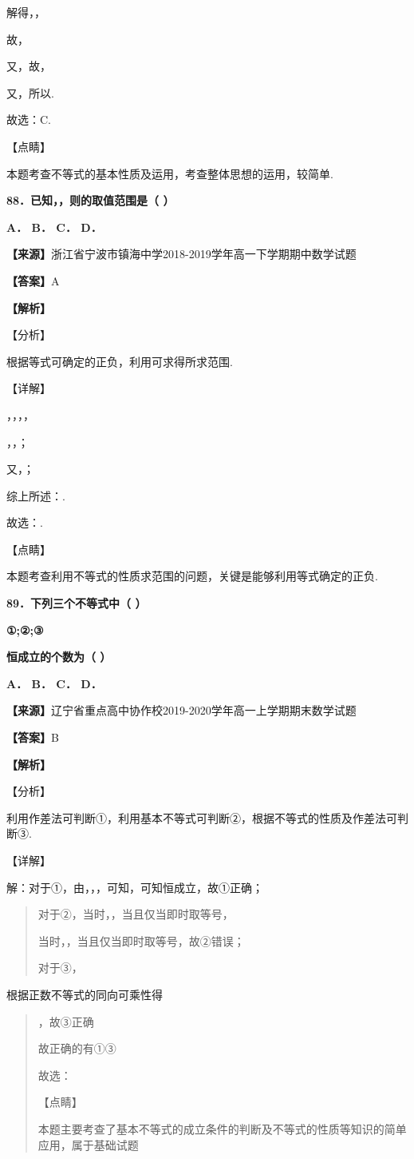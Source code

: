 \documentclass[
]{article}
\begin{document}
解得，，

故，

又，故，

又，所以.

故选：C.

【点睛】

本题考查不等式的基本性质及运用，考查整体思想的运用，较简单.

\textbf{88．已知，，则的取值范围是（ ）}

\textbf{A． B． C． D．}

\textbf{【来源】}浙江省宁波市镇海中学2018-2019学年高一下学期期中数学试题

\textbf{【答案】}A

\textbf{【解析】}

【分析】

根据等式可确定的正负，利用可求得所求范围.

【详解】

，，，，

，，；

又，；

综上所述：.

故选：.

【点睛】

本题考查利用不等式的性质求范围的问题，关键是能够利用等式确定的正负.

\textbf{89．下列三个不等式中（ ）}

\textbf{①;②;③}

\textbf{恒成立的个数为（ ）}

\textbf{A． B． C． D．}

\textbf{【来源】}辽宁省重点高中协作校2019-2020学年高一上学期期末数学试题

\textbf{【答案】}B

\textbf{【解析】}

【分析】

利用作差法可判断①，利用基本不等式可判断②，根据不等式的性质及作差法可判断③.

【详解】

解：对于①，由，，，可知，可知恒成立，故①正确；

\begin{quote}
对于②，当时，，当且仅当即时取等号，

当时，，当且仅当即时取等号，故②错误；

对于③，
\end{quote}

根据正数不等式的同向可乘性得

\begin{quote}
，故③正确

故正确的有①③

故选：

【点睛】

本题主要考查了基本不等式的成立条件的判断及不等式的性质等知识的简单应用，属于基础试题
\end{quote}
\end{document}
